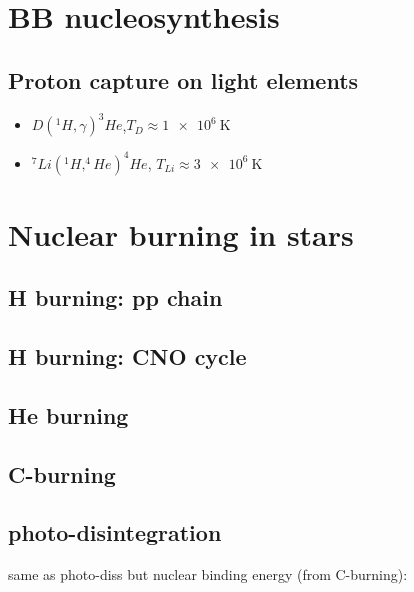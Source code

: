 \chapter{BB nucleosynthesis}
\PartialToc

\section{Proton capture on light elements}

\begin{itemize}
\item $D(^1H,\gamma)^3He$,$T_D\approx \SI{1e6}{\kelvin}$
\item $^7Li(^1H,^4He)^4He$, $T_{Li}\approx\SI{3e6}{\kelvin}$ 

\end{itemize}

\chapter{Nuclear burning in stars}
\PartialToc

\section{H burning: pp chain}

\section{H burning: CNO cycle}

\section{He burning}

\section{C-burning}

\section{photo-disintegration}
same as photo-diss but nuclear binding energy (from C-burning): 
